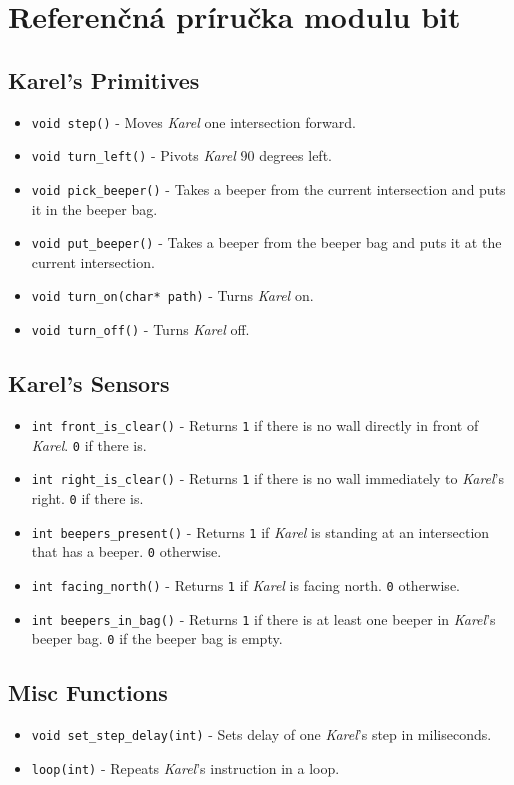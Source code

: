 
\chapter{Referenčná príručka modulu bit}\label{app:bit}


\section*{Karel's Primitives}

\begin{itemize}
    \item \verb|void step()| - Moves \textit{Karel} one intersection forward.
    \item \verb|void turn_left()| - Pivots \textit{Karel} $90$ degrees left.
    \item \verb|void pick_beeper()| - Takes a beeper from the current intersection and puts it in the beeper bag.
    \item \verb|void put_beeper()| - Takes a beeper from the beeper bag and puts it at the current intersection.
    \item \verb|void turn_on(char* path)| - Turns \textit{Karel} on.
    \item \verb|void turn_off()| - Turns \textit{Karel} off.
\end{itemize}


\section*{Karel's Sensors}

\begin{itemize}
    \item \verb|int front_is_clear()| - Returns \texttt{1} if there is no wall directly in front of \textit{Karel}. \texttt{0} if there is.
    \item \verb|int right_is_clear()| - Returns \texttt{1} if there is no wall immediately to \textit{Karel}'s right. \texttt{0} if there is.
    \item \verb|int beepers_present()| - Returns \texttt{1} if \textit{Karel} is standing at an intersection that has a beeper. \texttt{0} otherwise.
    \item \verb|int facing_north()| - Returns \texttt{1} if \textit{Karel} is facing north. \texttt{0} otherwise.
    \item \verb|int beepers_in_bag()| - Returns \texttt{1} if there is at least one beeper in \textit{Karel}'s beeper bag. \texttt{0} if the beeper bag is empty.
\end{itemize}


\section*{Misc Functions}

\begin{itemize}
    \item \verb|void set_step_delay(int)| - Sets delay of one \textit{Karel}'s step in miliseconds.
    \item \verb|loop(int)| - Repeats \textit{Karel}'s instruction in a loop.
\end{itemize}
